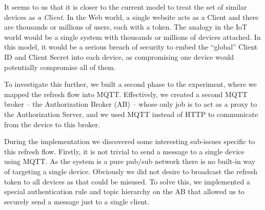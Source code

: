 \documentclass{llncs}
\newif\iflong
\begin{document}
It seems to us that it is closer to the current model to treat the set of similar devices as \textit{a Client}. In the Web world, a single 
website acts as a Client and there are thousands or millions of users, each with a token. The analogy in the IoT world
would be a single system with thousands or millions of devices attached. In this model, it would be a serious
breach of security to embed the ``global'' Client ID and Client Secret into each device, as compromising one device
would potentially compromise all of them. 

To investigate this further, we built a second phase to the experiment, where we mapped the refresh flow into MQTT.
Effectively, we created a second MQTT broker -- the Authorization Broker (AB) -- whose only job is to act as a proxy to the Authorization Server, and we used MQTT instead of HTTP to communicate from the device to this broker. 
\iflong
To explain this, let us name the two brokers: the first (existing) broker is the Data Broker (DB), where data is published and received.
The second broker is the Authorization Broker (AB).
The flow works as follows:
\begin{itemize}
\item The device attempts to connect to the Data Broker. 
\item The bearer token has expired and the connection is refused.
\item The device connects instead to the Authorization Broker (with no credentials)
\item The device passes the bearer key to the Authorization Broker
\item The Authorization Broker (or an agent attached to it) adds the Client ID and
 Client Secret and calls the real Authorization Server to refresh the token.
\item The Authorization Broker then returns the new Bearer Token to the client.
\item Finally the client disconnects from the AB and tries again to connect to the DB with the new Bearer Token.
\end{itemize}

\fi
During the implementation we discovered some interesting sub-issues specific to this refresh flow.
Firstly, it is not trivial to send a message to a single device using MQTT. As the system is a pure pub/sub network
there is no built-in way of targeting a single device. Obviously we did not desire to broadcast the refresh token to 
all devices as that could be misused. To solve this, we implemented a special authentication rule and topic hierarchy on the AB that allowed us to securely send a message just to a single client.
\end{document}
